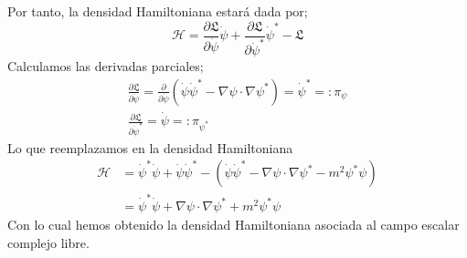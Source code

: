 \documentclass[../main.tex]{subfiles}
\begin{document}
 Por tanto, la densidad Hamiltoniana estará dada por;
 \begin{equation}
   \mathcal{H} = \frac{\partial \mathfrak{L}}{\partial \dot{\psi}} \dot{\psi}  + \frac{\partial \mathfrak{L}}{\partial \dot{\psi}^*} \dot{\psi}^* - \mathfrak{L}
  \end{equation}
  Calculamos las derivadas parciales;
  \begin{align*}
  \frac{\partial \mathfrak{L}}{\partial \dot{\psi}} = \frac{\partial}{\partial \dot{\psi}} \left( \dot{\psi}\dot{\psi}^* - \nabla \psi \cdot \nabla \psi^*  \right)  = \dot{\psi}^* = : \pi_\psi \\
    \frac{\partial \mathfrak{L}}{\partial \dot{\psi}^*} = \dot{\psi} = : \pi_{\psi^*}
  \end{align*}
Lo que reemplazamos en la densidad Hamiltoniana
\begin{align*}
  \mathcal{H} & = \dot{\psi}^* \dot{\psi} +  \dot{\psi}\dot{\psi}^* - \left( \dot{\psi} \dot{\psi}^* - \nabla \psi \cdot \nabla \psi^* - m^2 \psi^* \psi \right) \\
  & = \dot{\psi}^* \dot{\psi} + \nabla \psi \cdot \nabla \psi^*  + m^2 \psi^* \psi
\end{align*}
Con lo cual hemos obtenido la densidad Hamiltoniana asociada al campo escalar complejo libre.
\end{document}
